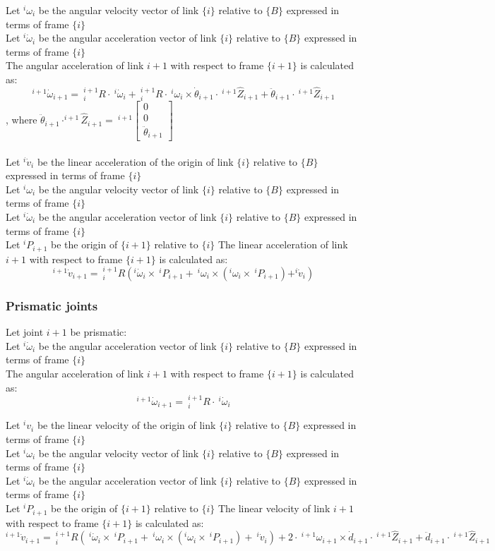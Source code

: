 \documentclass[10pt,a4paper]{article}
\newcommand{\vect}[1]{\ensuremath{\begin{bmatrix}#1\end{bmatrix}}}
\begin{document}
Let $^i\omega_i$ be the angular velocity vector of link $\{i\}$ relative to $\{B\}$ expressed in terms of frame $\{i\}$ \\
Let $^i\dot\omega_i$ be the angular acceleration vector of link $\{i\}$ relative to $\{B\}$ expressed in terms of frame $\{i\}$ \\
The angular acceleration of link $i + 1$ with respect to frame $\{i + 1\}$ is calculated as:
$$
^{i+1}\dot \omega_{i+1} = ~^{i+1}_iR ⋅ ~^i\dot \omega_i + ~^{i+1}_iR ⋅ ~^i\omega_i \times \dot \theta_{i+1} ⋅ ~^{i+1}\hat{Z}_{i+1} + \ddot \theta_{i+1} ⋅ ~^{i+1}\hat{Z}_{i+1}
$$
, where $\ddot \theta_{i+1} ⋅ ^{i+1}\hat{Z}_{i+1} = ~^{i+1}\vect{0 \\ 0 \\ \ddot{\theta}_{i+1}}$ \\
\\

Let $^i\dot v_i$ be the linear acceleration of the origin of link $\{i\}$ relative to $\{B\}$ expressed in terms of frame $\{i\}$ \\
Let $^i\omega_i$ be the angular velocity vector of link $\{i\}$ relative to $\{B\}$ expressed in terms of frame $\{i\}$ \\
Let $^i\dot \omega_i$ be the angular acceleration vector of link $\{i\}$ relative to $\{B\}$ expressed in terms of frame $\{i\}$ \\
Let $^iP_{i+1}$ be the origin of $\{i+1\}$ relative to $\{i\}$
The linear acceleration of link $i + 1$ with respect to frame $\{i + 1\}$ is calculated as:
$$
^{i+1}\dot v_{i+1} = ~^{i+1}_iR(^i\dot \omega_i \times ~^iP_{i+1} + ~^i\omega_i \times (^i\omega_i \times ~^iP_{i+1}) + ^i\dot v_i)
$$

\subsubsection{Prismatic joints}
Let joint $i+1$ be prismatic: \\

Let $^i\dot \omega_i$ be the angular acceleration vector of link $\{i\}$ relative to $\{B\}$ expressed in terms of frame $\{i\}$ \\
The angular acceleration of link $i + 1$ with respect to frame $\{i + 1\}$ is calculated as:
$$
^{i+1}\dot \omega_{i+1} = ~^{i+1}_iR ⋅ ~^i\dot \omega_i
$$

Let $^iv_i$ be the linear velocity of the origin of link $\{i\}$ relative to $\{B\}$ expressed in terms of frame $\{i\}$ \\
Let $^i\omega_i$ be the angular velocity vector of link $\{i\}$ relative to $\{B\}$ expressed in terms of frame $\{i\}$ \\
Let $^i\dot\omega_i$ be the angular acceleration vector of link $\{i\}$ relative to $\{B\}$ expressed in terms of frame $\{i\}$ \\
Let $^iP_{i+1}$ be the origin of $\{i+1\}$ relative to $\{i\}$
The linear velocity of link $i + 1$ with respect to frame $\{i + 1\}$ is calculated as:
$$
^{i+1}\dot v_{i+1} = ~^{i+1}_iR(~^i\dot \omega_i \times ~^iP_{i+1} + ~^i\omega_i \times (^i \omega_i \times ~^iP_{i+1}) + ~^i\dot v_i) + 2 ⋅ ~^{i+1} \omega_{i+1} \times \dot{d}_{i+1} ⋅ ~^{i+1}\hat{Z}_{i+1} + \ddot{d}_{i+1} ⋅ ~^{i+1}\hat{Z}_{i+1}
$$
\end{document}
